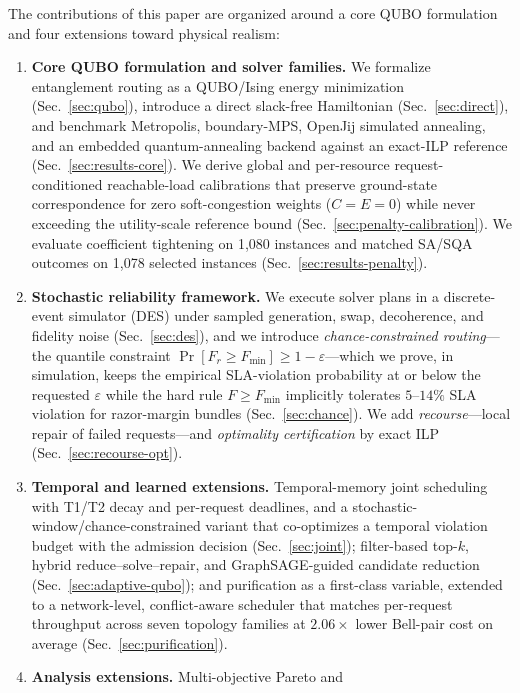 \documentclass[twocolumn]{article}
\begin{document}
The contributions of this paper are organized around a core QUBO
formulation and four extensions toward physical realism:
\begin{enumerate}
  \item \textbf{Core QUBO formulation and solver families.}  We
    formalize entanglement routing as a QUBO/Ising energy
    minimization (Sec.~\ref{sec:qubo}), introduce a direct
    slack-free Hamiltonian
    (Sec.~\ref{sec:direct}), and benchmark Metropolis, boundary-MPS,
    OpenJij simulated annealing, and an embedded quantum-annealing
    backend against an exact-ILP reference (Sec.~\ref{sec:results-core}).
    We derive global and per-resource request-conditioned reachable-load
    calibrations that preserve ground-state correspondence for zero
    soft-congestion weights ($C=E=0$) while never exceeding the
    utility-scale reference bound (Sec.~\ref{sec:penalty-calibration}).
    We evaluate coefficient tightening on 1,080 instances and matched 
    SA/SQA outcomes on 1,078 selected instances (Sec.~\ref{sec:results-penalty}).
  \item \textbf{Stochastic reliability framework.}  We execute solver
    plans in a discrete-event simulator (DES) under sampled
    generation, swap, decoherence, and fidelity noise
    (Sec.~\ref{sec:des}), and we introduce
    \emph{chance-constrained routing}---the quantile constraint
    $\Pr[F_r \ge F_{\min}] \ge 1-\varepsilon$---which we prove, in
    simulation, keeps the empirical SLA-violation probability at or
    below the requested $\varepsilon$ while the hard rule
    $F \ge F_{\min}$ implicitly tolerates $5$--$14\%$ SLA violation for
    razor-margin bundles (Sec.~\ref{sec:chance}).  We add
    \emph{recourse}---local repair of failed requests---and
    \emph{optimality certification} by exact ILP
    (Sec.~\ref{sec:recourse-opt}).
  \item \textbf{Temporal and learned extensions.}  Temporal-memory
    joint scheduling with T1/T2 decay and per-request deadlines, and a
    stochastic-window/chance-constrained variant that co-optimizes a
    temporal violation budget with the admission decision
    (Sec.~\ref{sec:joint}); filter-based top-$k$, hybrid
    reduce--solve--repair, and GraphSAGE-guided candidate reduction
    (Sec.~\ref{sec:adaptive-qubo}); and purification as a first-class
    variable, extended to a network-level, conflict-aware scheduler
    that matches per-request throughput across seven topology families
    at $2.06\times$ lower Bell-pair cost on average
    (Sec.~\ref{sec:purification}).
  \item \textbf{Analysis extensions.}  Multi-objective Pareto and

\end{enumerate}
\end{document}
